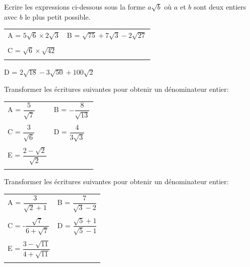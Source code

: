 \begin{exercice}

Ecrire les expressions ci-dessous sous la forme $a \sqrt{b}$  où $a$ et $b$ sont deux entiers avec $b$ le plus petit possible.\\

\begin{tabular}{m{3.8cm}m{3.5cm}}
A = $5\sqrt{6} \times 2\sqrt{3}$ & B = $\sqrt{75}+7\sqrt{3}-2\sqrt{27}$\\
&\\
C = $\sqrt{6} \times \sqrt{42}$ &\\
&\\

\end{tabular}

D = $2\sqrt{18}-3\sqrt{50}+100\sqrt{2}$ \\
\end{exercice}


\begin{exercice}
Transformer les écritures suivantes pour obtenir un dénominateur entier:\\

\begin{tabular}{m{3.8cm}m{3.5cm}}
A = $\dfrac{5}{\sqrt{7}}$ & B = $-\dfrac{8}{\sqrt{13}}$\\
&\\
C = $\dfrac{3}{\sqrt{6}}$ & D = $\dfrac{4}{3\sqrt{3}}$\\
&\\
E = $\dfrac{2-\sqrt{2}}{\sqrt{2}}$ &\\
&\\


\end{tabular}
\end{exercice}

\begin{exercice}
Transformer les écritures suivantes pour obtenir un dénominateur entier:\\

\begin{tabular}{m{3.8cm}m{3.5cm}}
A = $\dfrac{3}{\sqrt{2}+1}$ & B = $\dfrac{7}{\sqrt{3}-2}$\\
&\\
C = -$\dfrac{\sqrt{7}}{6+\sqrt{7}}$ & D = $\dfrac{\sqrt{5}+1}{\sqrt{5}-1}$\\
&\\
E = $\dfrac{3-\sqrt{11}}{4+\sqrt{11}}$ &\\
&\\

\end{tabular}

\end{exercice}

